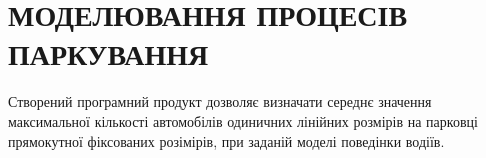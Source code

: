 \chapter{МОДЕЛЮВАННЯ ПРОЦЕСІВ ПАРКУВАННЯ}
\hspace{10pt}

Створений програмний продукт дозволяє визначати середнє значення максимальної кількості автомобілів  одиничних лінійних розмірів на парковці прямокутної фіксованих розімірів, при заданій моделі поведінки водіїв.


